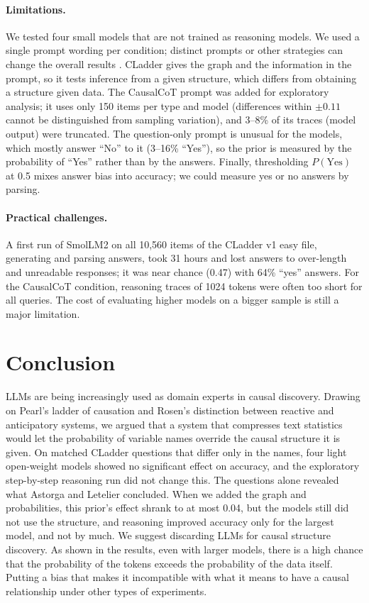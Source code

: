 \documentclass{llncs}
\newif\ifincludeappendix
\begin{document}
\paragraph{Limitations.} We tested four small models that are not trained as reasoning models. We used a single prompt wording per condition; distinct prompts or other strategies can change the overall results . CLadder gives the graph and the information in the prompt, so it tests inference from a given structure, which differs from obtaining a structure given data. The CausalCoT prompt was added for exploratory analysis; it uses only 150 items per type and model (differences within $\pm 0.11$ cannot be distinguished from sampling variation), and 3--8\% of its traces (model output) were truncated.
The question-only prompt is unusual for the models, which mostly answer ``No'' to it (3--16\% ``Yes''), so the prior is measured by the probability of ``Yes'' rather than by the answers. Finally, thresholding $P(\text{Yes})$ at 0.5 mixes answer bias into accuracy; we could measure yes or no answers by parsing. 

\paragraph{Practical challenges.} A first run of SmolLM2 on all 10,560 items of the CLadder v1 easy file, generating and parsing answers, took 31 hours and lost answers to over-length and unreadable responses; it was near chance (0.47) with 64\% ``yes'' answers. For the CausalCoT condition, reasoning traces of 1024 tokens were often too short for all queries. The cost of evaluating higher models on a bigger sample is still a major limitation. 


\section{Conclusion}
\label{sec:conclusion}

LLMs are being increasingly used as domain experts in causal discovery. Drawing on Pearl's ladder of causation and Rosen's distinction between reactive and anticipatory systems, we argued that a system that compresses text statistics would let the probability of variable names override the causal structure it is given. On matched CLadder questions that differ only in the names, four light open-weight models showed no significant effect on accuracy, and the exploratory step-by-step reasoning run did not change this. The questions alone revealed what Astorga and Letelier concluded. When we added the graph and probabilities, this prior's effect shrank to at most 0.04, but the models still did not use the structure, and reasoning improved accuracy only for the largest model, and not by much. We suggest discarding LLMs for causal structure discovery. As shown in the results, even with larger models, there is a high chance that the probability of the tokens exceeds the probability of the data itself. Putting a bias that makes it incompatible with what it means to have a causal relationship under other types of experiments. 

%
%


\ifincludeappendix
\appendix

\fi
\end{document}
